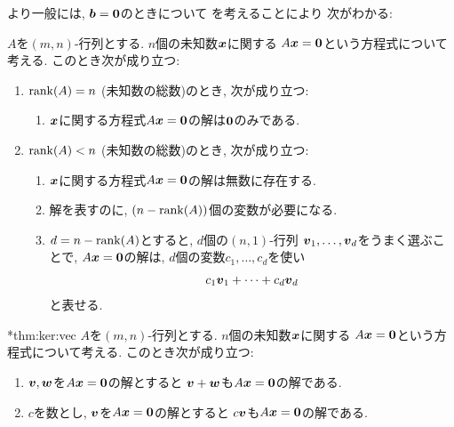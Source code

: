 より一般には,
$\boldsymbol{b}=\boldsymbol{0}$のときについて
を考えることにより
次がわかる:
\begin{theorem}
  \label{thm:solution:homoge}
  
$A$を$(m,n)$-行列とする.
$n$個の未知数$\boldsymbol{x}$に関する
$A\boldsymbol{x}=\boldsymbol{0}$という方程式について考える.
  このとき次が成り立つ:
  \begin{enumerate}
  \item $\operatorname{rank}(A)=n$ (未知数の総数)のとき, 次が成り立つ:
    \begin{enumerate}
    \item $\boldsymbol{x}$に関する方程式$A\boldsymbol{x}=\boldsymbol{0}$の解は$\boldsymbol{0}$のみである.
    \end{enumerate}
  \item $\operatorname{rank}(A)<n$ (未知数の総数)のとき, 次が成り立つ:
    \begin{enumerate}
    \item $\boldsymbol{x}$に関する方程式$A\boldsymbol{x}=\boldsymbol{0}$の解は無数に存在する.
    \item 解を表すのに, $(n-\operatorname{rank}(A))$個の変数が必要になる.
    \item $d=n-\operatorname{rank}(A)$とすると,
      $d$個の$(n,1)$-行列
      $\boldsymbol{v}_1,\ldots,\boldsymbol{v}_d$をうまく選ぶことで,
      $A\boldsymbol{x}=\boldsymbol{0}$の解は, $d$個の変数$c_1,\ldots,c_d$を使い
      \begin{align*}
        c_1\boldsymbol{v}_1+\cdots+c_d\boldsymbol{v}_d
      \end{align*}
      と表せる.
    \end{enumerate}
  \end{enumerate}
\end{theorem}

\begin{prop}
  \provelater**{thm:ker:vec}
  \label{thm:ker:vec}
  $A$を$(m,n)$-行列とする.
  $n$個の未知数$\boldsymbol{x}$に関する
  $A\boldsymbol{x}=\boldsymbol{0}$という方程式について考える.
  このとき次が成り立つ:
  \begin{enumerate}
  \item{}
    $\boldsymbol{v},\boldsymbol{w}$を$A\boldsymbol{x}=\boldsymbol{0}$の解とすると $\boldsymbol{v}+\boldsymbol{w}$も$A\boldsymbol{x}=\boldsymbol{0}$の解である.
  \item{}
    $c$を数とし, $\boldsymbol{v}$を$A\boldsymbol{x}=\boldsymbol{0}$の解とすると $c\boldsymbol{v}$も$A\boldsymbol{x}=\boldsymbol{0}$の解である.
  \end{enumerate}
\end{prop}



